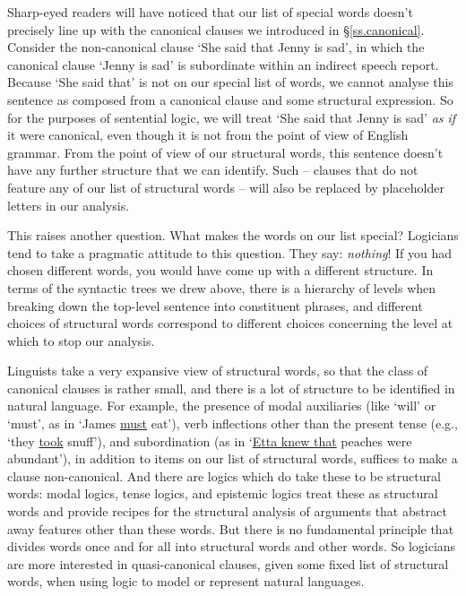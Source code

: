 Sharp-eyed readers will have noticed that our list of special words doesn't precisely line up with the canonical clauses we introduced in §\ref{ss.canonical}. Consider the non-canonical clause `She said that Jenny is sad', in which the canonical clause `Jenny is sad' is subordinate within an indirect speech report. Because `She said that' is not on our special list of words, we cannot analyse this sentence as composed from a canonical clause and some structural expression. So for the purposes of sentential logic, we will treat `She said that Jenny is sad' \emph{as if} it were canonical, even though it is not from the point of view of English grammar. From the point of view of our structural words, this sentence doesn't have any further structure that we can identify. Such  – clauses that do not feature any of our list of structural words – will also be replaced by placeholder letters in our analysis. 


This raises another question. What makes the words on our list special? Logicians tend to take a pragmatic attitude to this question. They say: \emph{nothing}! If you had chosen different words, you would have come up with a different structure. In terms of the syntactic trees we drew above, there is a hierarchy of levels when breaking down the top-level sentence into constituent phrases, and different choices of structural words correspond to different choices concerning the level at which to stop our analysis.

Linguists take a very expansive view of structural words, so that the class of canonical clauses is rather small, and there is a lot of structure to be identified in natural language. For example, the presence of modal auxiliaries (like `will' or `must', as in `James \underline{must} eat'), verb inflections other than the present tense (e.g., `they \underline{took} snuff'), and subordination (as in `\underline{Etta knew that} peaches were abundant'), in addition to items on our list of structural words, suffices to make a clause non-canonical. And there are logics which do take these to be structural words: modal logics, tense logics, and epistemic logics treat these as structural words and provide recipes for the structural analysis of arguments that abstract away features other than these words. But there is no fundamental principle that divides words once and for all into structural words and other words. So logicians are more interested in quasi-canonical clauses, given some fixed list of structural words, when using logic to model or represent natural languages. 

